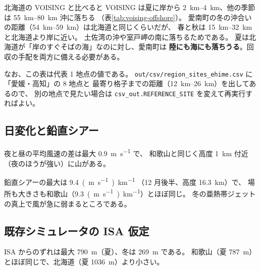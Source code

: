 \begin{whybox}{北海道の VOISING と比べると}
VOISING は夏に岸から \SIrange{2}{4}{\kilo\metre}、他の季節は \SIrange{55}{80}{\kilo\metre} 沖に落ちる
（表\ref{tab:voising-offshore}）。
愛南町の冬の沖合いの距離（\SIrange{54}{59}{\kilo\metre}）は北海道と同じくらいだが、
春と秋は \SIrange{15}{32}{\kilo\metre} と北海道より岸に近い。
土佐湾の沖や室戸岬の南に落ちるためである。
夏は北海道が「岸のすぐそばの海」なのに対し、愛南町は
\textbf{陸にも海にも落ちうる}。回収の手配を両方に備える必要がある。

なお、この表は代表 1 地点の値である。
\texttt{out/csv/region\_sites\_ehime.csv} に「愛媛・高知」の 8 地点と
最寄り格子までの距離（\SIrange{12}{26}{\kilo\metre}）を出してあるので、
別の地点で見たい場合は \texttt{csv\_out.REFERENCE\_SITE} を変えて再実行すればよい。
\end{whybox}

\subsection{日変化と鉛直シアー}




夜と昼の平均風速の差は最大 \SI{0.9}{\metre\per\second} で、
和歌山と同じく高度 \SI{1}{\kilo\metre} 付近（夜のほうが強い）に山がある。

鉛直シアーの最大は \SI{9.4}{(\metre\per\second)\per\kilo\metre}
（12 月後半、高度 \SI{16.3}{\kilo\metre}）で、
場所も大きさも和歌山（\SI{9.3}{(\metre\per\second)\per\kilo\metre}）とほぼ同じ。
冬の亜熱帯ジェットの真上で風が急に弱まるところである。

\subsection{既存シミュレータの ISA 仮定}



ISA からのずれは最大 \SI{790}{\metre}（夏）、冬は \SI{269}{\metre} である。
和歌山（夏 \SI{787}{\metre}）とほぼ同じで、北海道（夏 \SI{1036}{\metre}）より小さい。
